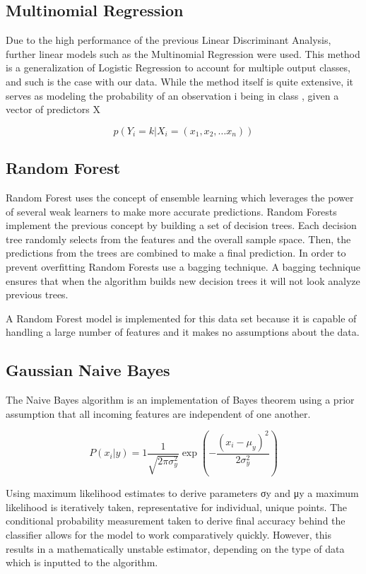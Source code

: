 \documentclass[12pt]{article}
\begin{document}
\subsection{Multinomial Regression}
Due to the high performance of the previous Linear Discriminant Analysis, further linear models such as the Multinomial Regression were used. This method is a generalization of Logistic Regression to account for multiple output classes, and such is the case with our data. While the method itself is quite extensive, it serves as modeling the probability of an observation i being in class , given a vector of predictors X

$$ p(Y_{i} = k | X_i= (x_{1}, x_{2}, \ldots x_{n})) $$

\subsection{Random Forest}
Random Forest uses the concept of ensemble learning which leverages the power of several weak learners to make more accurate predictions. Random Forests implement the previous concept by building a set of decision trees. Each decision tree randomly selects from the features and the overall sample space. Then, the predictions from the trees are combined to make a final prediction. In order to prevent overfitting Random Forests use a bagging technique. A bagging technique ensures that when the algorithm builds new decision trees it will not look analyze previous trees.

A Random Forest model is implemented for this data set because it is capable of handling a large number of features and it makes no assumptions about the data. 


\subsection{Gaussian Naive Bayes}
The Naive Bayes algorithm is an implementation of Bayes theorem using a prior assumption that all incoming features are independent of one another. 

$$P(x_i | y) = 1\frac{1}{\sqrt{2\pi\sigma^{2}_y}}\exp(-\frac{(x_i - \mu_y)^2}{2\sigma^2_y})$$


Using maximum likelihood estimates to derive parameters σy and μy a maximum likelihood is iteratively taken, representative for individual, unique points.  The conditional probability measurement taken to derive final accuracy behind the classifier allows for the model to work comparatively quickly. However, this results in a mathematically unstable estimator, depending on the type of data which is inputted to the algorithm. 
\end{document}

